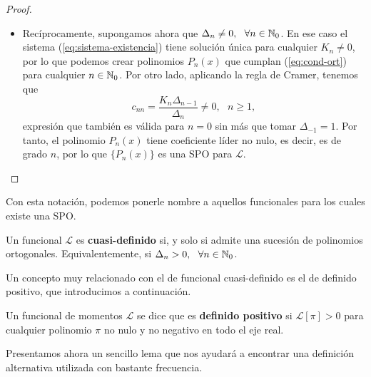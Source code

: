 \begin{proof}
\begin{itemize}
        \item[\fbox{$\Leftarrow$}] Recíprocamente, supongamos ahora que $\Delta_n\neq 0, \ \ \forall n\in\mathbb{N}_0$. En ese caso el sistema (\ref{eq:sistema-existencia}) tiene solución única para cualquier $K_n\neq 0$, por lo que podemos crear polinomios $P_n(x)$ que cumplan (\ref{eq:cond-ort}) para cualquier $n\in\mathbb{N}_0$. Por otro lado, aplicando la regla de Cramer, tenemos que
        \begin{equation}
            \label{eq:cnn}
            c_{nn} = \dfrac{K_n \Delta_{n-1}}{\Delta_n} \neq 0, \ \ \ n\geq 1,
        \end{equation}
        expresión que también es válida para $n=0$ sin más que tomar $\Delta_{-1}=1$. Por tanto, el polinomio $P_n(x)$ tiene coeficiente líder no nulo, es decir, es de grado $n$, por lo que $\{P_n(x)\}$ es una SPO para $\mathcal L$. 
    \end{itemize}

\end{proof}

Con esta notación, podemos ponerle nombre a aquellos funcionales para los cuales existe una SPO.

\begin{definicion}
    Un funcional $\mathcal L$ es \textbf{cuasi-definido} si, y solo si admite una sucesión de polinomios ortogonales. Equivalentemente, si $\Delta_n > 0, \ \ \forall n\in \mathbb{N}_0$.
    
\end{definicion}

Un concepto muy relacionado con el de funcional cuasi-definido es el de definido positivo, que introducimos a continuación.

\begin{definicion}
    \label{def:func-def-pos}

    Un funcional de momentos $\mathcal{L}$ se dice que es \textbf{definido positivo} si $\mathcal{L}[\pi] > 0$ para cualquier polinomio $\pi$ no nulo y no negativo en todo el eje real.
    
\end{definicion}

Presentamos ahora un sencillo lema que nos ayudará a encontrar una definición alternativa utilizada con bastante frecuencia. 

